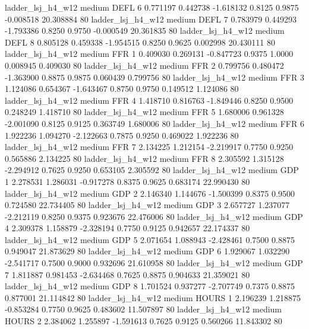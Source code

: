      ladder_lsj_h4_w12     medium     DEFL                 6  0.771197 0.442738 -1.618132 0.8125 0.9875 -0.008518   20.308884 80
     ladder_lsj_h4_w12     medium     DEFL                 7  0.783979 0.449293 -1.793386 0.8250 0.9750 -0.000549   20.361835 80
     ladder_lsj_h4_w12     medium     DEFL                 8  0.805128 0.459338 -1.954515 0.8250 0.9625  0.002998   20.430111 80
     ladder_lsj_h4_w12     medium      FFR                 1  0.409030 0.269131 -0.847723 0.9375 1.0000  0.008945    0.409030 80
     ladder_lsj_h4_w12     medium      FFR                 2  0.799756 0.480472 -1.363900 0.8875 0.9875  0.060439    0.799756 80
     ladder_lsj_h4_w12     medium      FFR                 3  1.124086 0.654367 -1.643467 0.8750 0.9750  0.149512    1.124086 80
     ladder_lsj_h4_w12     medium      FFR                 4  1.418710 0.816763 -1.849446 0.8250 0.9500  0.248249    1.418710 80
     ladder_lsj_h4_w12     medium      FFR                 5  1.680006 0.961328 -2.001090 0.8125 0.9125  0.363749    1.680006 80
     ladder_lsj_h4_w12     medium      FFR                 6  1.922236 1.094270 -2.122663 0.7875 0.9250  0.469022    1.922236 80
     ladder_lsj_h4_w12     medium      FFR                 7  2.134225 1.212154 -2.219917 0.7750 0.9250  0.565886    2.134225 80
     ladder_lsj_h4_w12     medium      FFR                 8  2.305592 1.315128 -2.294912 0.7625 0.9250  0.653105    2.305592 80
     ladder_lsj_h4_w12     medium      GDP                 1  2.278531 1.286031 -0.917278 0.8375 0.9625  0.683174   22.990430 80
     ladder_lsj_h4_w12     medium      GDP                 2  2.146340 1.144676 -1.500399 0.8375 0.9500  0.724580   22.734405 80
     ladder_lsj_h4_w12     medium      GDP                 3  2.657727 1.237077 -2.212119 0.8250 0.9375  0.923676   22.476006 80
     ladder_lsj_h4_w12     medium      GDP                 4  2.309378 1.158879 -2.328194 0.7750 0.9125  0.942657   22.174337 80
     ladder_lsj_h4_w12     medium      GDP                 5  2.071654 1.088943 -2.428461 0.7500 0.8875  0.949047   21.873629 80
     ladder_lsj_h4_w12     medium      GDP                 6  1.929067 1.032290 -2.541717 0.7500 0.9000  0.932696   21.610958 80
     ladder_lsj_h4_w12     medium      GDP                 7  1.811887 0.981453 -2.634468 0.7625 0.8875  0.904633   21.359021 80
     ladder_lsj_h4_w12     medium      GDP                 8  1.701524 0.937277 -2.707749 0.7375 0.8875  0.877001   21.114842 80
     ladder_lsj_h4_w12     medium    HOURS                 1  2.196239 1.218875 -0.853284 0.7750 0.9625  0.483602   11.507897 80
     ladder_lsj_h4_w12     medium    HOURS                 2  2.384062 1.255897 -1.591613 0.7625 0.9125  0.560266   11.843302 80
